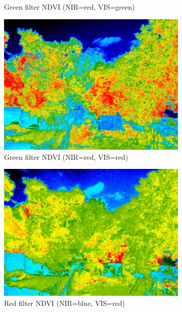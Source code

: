 \begin{appendices}
\begin{figure}[H]
\begin{subfigure}{0.5\textwidth}
\caption{Green filter NDVI (NIR=red, VIS=green)}
\end{subfigure}
\begin{subfigure}{0.5\textwidth}
\centering
\includegraphics[scale=0.17]{filter/green_d_ndvi.jpg}
\caption{Green filter NDVI (NIR=red, VIS=red)}
\end{subfigure}
\begin{subfigure}{0.5\textwidth}
\centering
\includegraphics[scale=0.17]{filter/red_Color_Index.jpg}
\caption{Red filter NDVI (NIR=blue, VIS=red)}
\end{subfigure}
\begin{subfigure}{0.5\textwidth}
\centering

\end{subfigure}
\end{figure}
\end{appendices}
